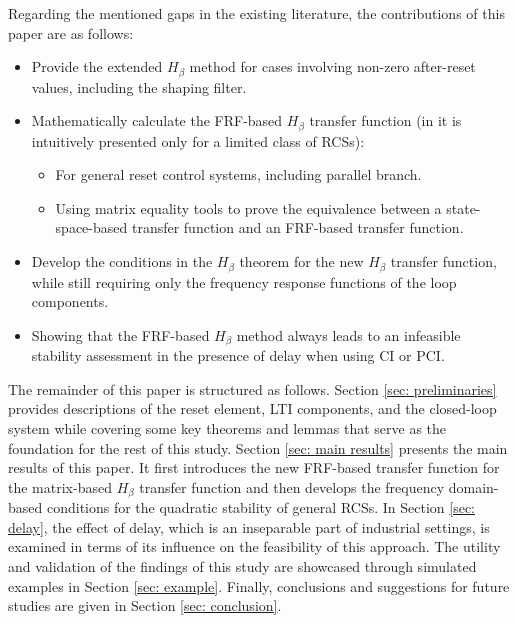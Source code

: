 Regarding the mentioned gaps in the existing literature, the contributions of this paper are as follows:
\begin{itemize}
    \item Provide the extended $H_\beta$ method for cases involving non-zero after-reset values, including the shaping filter.
    \item Mathematically calculate the FRF-based $H_\beta$ transfer function (in \cite{dastjerdi2023frequency} it is intuitively presented only for a limited class of RCSs):
    \begin{itemize}
        \item For general reset control systems, including parallel branch.
        \item Using matrix equality tools to prove the equivalence between a state-space-based transfer function and an FRF-based transfer function.
    \end{itemize}
    \item{Develop the conditions in the $H_\beta$ theorem for the new $H_\beta$ transfer function, while still requiring only the frequency response functions of the loop components.}
    \item Showing that the FRF-based $H_\beta$ method always leads to an infeasible stability assessment in the presence of delay when using CI or PCI.
\end{itemize}

The remainder of this paper is structured as follows. Section \ref{sec: preliminaries} provides descriptions of the reset element, LTI components, and the closed-loop system while covering some key theorems and lemmas that serve as the foundation for the rest of this study.
Section \ref{sec: main results} presents the main results of this paper. It first introduces the new FRF-based transfer function for the matrix-based $H_\beta$ transfer function and then develops the frequency domain-based conditions for the quadratic stability of general RCSs.
In Section \ref{sec: delay}, the effect of delay, which is an inseparable part of industrial settings, is examined in terms of its influence on the feasibility of this approach.
The utility and validation of the findings of this study are showcased through simulated examples in Section \ref{sec: example}. Finally, conclusions and suggestions for future studies are given in Section \ref{sec: conclusion}.